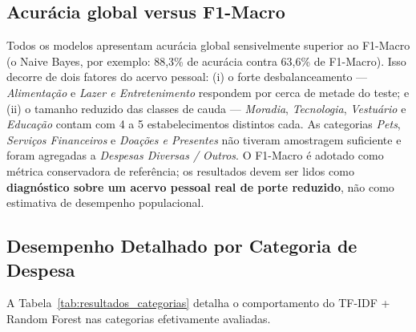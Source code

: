 \subsection{Acurácia global versus F1-Macro}
Todos os modelos apresentam acurácia global sensivelmente superior ao F1-Macro (o Naive
Bayes, por exemplo: 88,3\% de acurácia contra
63,6\% de F1-Macro). Isso decorre de dois fatores do acervo pessoal:
(i) o forte desbalanceamento --- \textit{Alimentação} e \textit{Lazer e
Entretenimento} respondem por cerca de metade do teste; e (ii) o tamanho reduzido das
classes de cauda --- \textit{Moradia}, \textit{Tecnologia}, \textit{Vestuário} e
\textit{Educação} contam com 4 a 5 estabelecimentos distintos cada. As categorias
\textit{Pets}, \textit{Serviços Financeiros} e \textit{Doações e Presentes} não
tiveram amostragem suficiente e foram agregadas a \textit{Despesas Diversas / Outros}. O
F1-Macro é adotado como métrica conservadora de referência; os resultados devem ser lidos
como \textbf{diagnóstico sobre um acervo pessoal real de porte reduzido}, não como
estimativa de desempenho populacional.

\subsection{Desempenho Detalhado por Categoria de Despesa}
A Tabela~\ref{tab:resultados_categorias} detalha o comportamento do TF-IDF + Random Forest nas
categorias efetivamente avaliadas.

